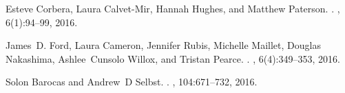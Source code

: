 \documentclass{article}
\begin{document}
\begin{thebibliography}{10}
		Esteve Corbera, Laura Calvet-Mir, Hannah Hughes, and Matthew Paterson.
		.
		, 6(1):94--99, 2016.
		
		James~D. Ford, Laura Cameron, Jennifer Rubis, Michelle Maillet, Douglas
		Nakashima, Ashlee~Cunsolo Willox, and Tristan Pearce.
		.
		, 6(4):349--353, 2016.
		
		Solon Barocas and Andrew~D Selbst.
		.
		, 104:671--732, 2016.
		
	\end{thebibliography}
	
	
	
	
\end{document}

